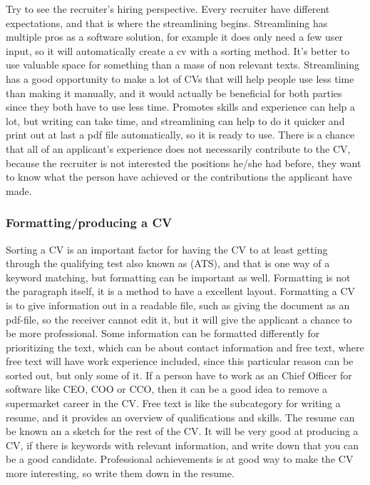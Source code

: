 Try to see the recruiter's hiring perspective. Every recruiter have different expectations, 
and that is where the streamlining begins. Streamlining has multiple pros as a software solution,
for example it does only need a few user input, so it will automatically create a cv with a sorting method. 
It's better to use valuable space for something than a mass of non relevant texts.
Streamlining has a good opportunity to make a lot of CVs that will help people use less time than making it manually,
and it would actually be beneficial for both parties since they both have to use less time.
Promotes skills and experience can help a lot, but writing can take time, and streamlining can help to do it quicker 
and print out at last a pdf file automatically, so it is ready to use.
There is a chance that all of an applicant's experience does not necessarily contribute to the CV, 
because the recruiter is not interested the positions he/she had before, they want to know what the person have achieved
or the contributions the applicant have made. 

\subsubsection{Formatting/producing a CV}
Sorting a CV is an important factor for having the CV to at least getting through the qualifying test also known as (ATS),
and that is one way of a keyword matching, but formatting can be important as well.
Formatting is not the paragraph itself, it is a method to have a excellent layout. 
Formatting a CV is to give information out in a readable file, such as giving the document as an pdf-file,
so the receiver cannot edit it, but it will give the applicant a chance to be more professional.
Some information can be formatted differently for prioritizing the text, which can be about contact information and free text, 
where free text will have work experience included, since this particular reason can be sorted out, but only some of it. 
If a person have to work as an Chief Officer for software 
like CEO, COO or CCO, then it can be a good idea to remove a supermarket career in the CV. 
Free text is like the subcategory for writing a resume, and it 
provides an overview of qualifications and skills. The resume can be known an a sketch for the rest of the CV. 
It will be very good at producing a CV, if there is keywords with relevant information, 
and write down that you can be a good candidate.
Professional achievements is at good way to make the CV more interesting, so write them down in the resume.


